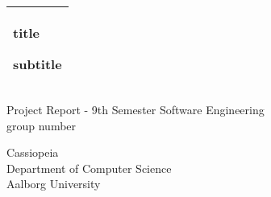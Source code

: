 %
\begin{titlepage}
  \addtolength{\hoffset}{0.5\evensidemargin-0.5\oddsidemargin} %
  \noindent%
  \begin{tabular}{@{}p{\textwidth}@{}}
    \toprule[2pt]
    \midrule
    \vspace{0.2cm}
    \begin{center}
    \Huge{\textbf{
      title%
    }}
    \end{center}
    \begin{center}
      \Large{
        subtitle %
      }
    \end{center}
    \vspace{0.2cm}\\
    \midrule
    \toprule[2pt]
  \end{tabular}
  \vspace{4 cm}
  \begin{center}
    {\large
      Project Report - 9th Semester Software Engineering %
    }\\
    \vspace{0.2cm}
    {\Large
      group number%
    }
  \end{center}
  \vfill
  \begin{center}
  Cassiopeia\\
  Department of Computer Science\\
  Aalborg University
  \end{center}
\end{titlepage}
\clearpage
